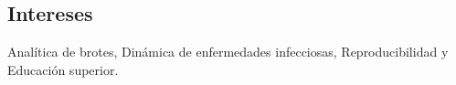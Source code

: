 \documentclass[margin,line]{res}
\begin{document}
\begin{resume}

\vspace*{.15in}

\section{\sc Intereses}%

Analítica de brotes, Dinámica de enfermedades infecciosas, Reproducibilidad y Educación superior.






\end{resume}
\end{document}
